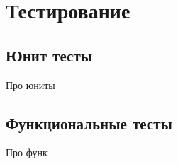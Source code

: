 \section{Тестирование}
\subsection{Юнит тесты}
Про юниты

\subsection{Функциональные тесты}
Про функ
